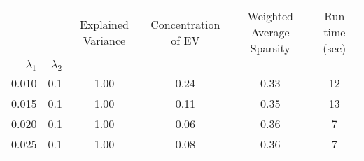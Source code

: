 \begin{tabular}{rr|cccc}
\toprule
      &     &  Explained Variance &  Concentration of EV &  Weighted Average Sparsity & Run time (sec) \\
$\lambda_1$ & $\lambda_2$ &                     &                      &                            &                \\
\midrule
0.010 & 0.1 &                1.00 &                 0.24 &                       0.33 &             12 \\
0.015 & 0.1 &                1.00 &                 0.11 &                       0.35 &             13 \\
0.020 & 0.1 &                1.00 &                 0.06 &                       0.36 &              7 \\
0.025 & 0.1 &                1.00 &                 0.08 &                       0.36 &              7 \\
\bottomrule
\end{tabular}
